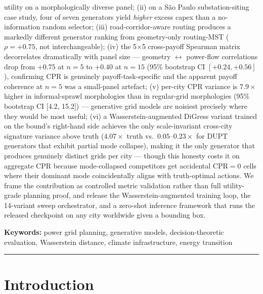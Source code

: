 \documentclass[10pt,a4paper]{article}
\begin{document}
utility on a morphologically diverse panel; (ii) on a São Paulo
substation-siting case study, four of seven generators yield
\emph{higher} excess capex than a no-information random selector;
(iii) road-corridor-aware routing produces a markedly different
generator ranking from geometry-only routing-MST
($\rho = +0.75$, not interchangeable); (iv) the 5$\times$5
cross-payoff Spearman matrix decorrelates dramatically with panel
size --- geometry $\leftrightarrow$ power-flow correlations drop
from $+0.75$ at $n=5$ to $+0.40$ at $n=15$ (95\% bootstrap CI
$[+0.24, +0.56]$), confirming CPR is genuinely payoff-task-specific
and the apparent payoff coherence at $n=5$ was a small-panel
artefact; (v) per-city CPR variance is $7.9\times$ higher in
informal-sprawl morphologies than in regular-grid morphologies
(95\% bootstrap CI [4.2, 15.2]) --- generative grid models are
noisiest precisely where they would be most useful;
(vi) a Wasserstein-augmented DiGress variant trained on the bound's
right-hand side achieves the only scale-invariant cross-city
signature variance above truth ($4.07\times$ truth vs.\
$0.05$--$0.23\times$ for DUPT generators that exhibit partial
mode collapse), making it the only generator that produces
genuinely distinct grids per city --- though this honesty costs it
on aggregate CPR because mode-collapsed competitors get
accidental CPR$=0$ cells where their dominant mode coincidentally
aligns with truth-optimal actions. We frame the contribution as controlled metric
validation rather than full utility-grade planning proof, and
release the Wasserstein-augmented training loop, the 14-variant
sweep orchestrator, and a zero-shot inference framework that
runs the released checkpoint on any city worldwide given a
bounding box.

\smallskip

\noindent\textbf{\color{NEblue}Keywords:} power grid planning,
generative models, decision-theoretic evaluation, Wasserstein
distance, climate infrastructure, energy transition

\vspace{4pt}\textcolor{NEblue}{\rule{\linewidth}{0.4pt}}\par

\section{Introduction}
\end{document}
